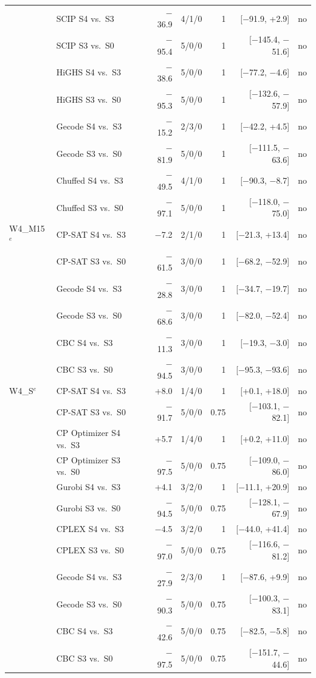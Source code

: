 \begin{longtable}{llrrrrl}
 & SCIP S4 vs.\ S3 & $-$36.9 & 4/1/0 & 1 & [$-$91.9, +2.9] & no \\
 & SCIP S3 vs.\ S0 & $-$95.4 & 5/0/0 & 1 & [$-$145.4, $-$51.6] & no \\
 & HiGHS S4 vs.\ S3 & $-$38.6 & 5/0/0 & 1 & [$-$77.2, $-$4.6] & no \\
 & HiGHS S3 vs.\ S0 & $-$95.3 & 5/0/0 & 1 & [$-$132.6, $-$57.9] & no \\
 & Gecode S4 vs.\ S3 & $-$15.2 & 2/3/0 & 1 & [$-$42.2, +4.5] & no \\
 & Gecode S3 vs.\ S0 & $-$81.9 & 5/0/0 & 1 & [$-$111.5, $-$63.6] & no \\
 & Chuffed S4 vs.\ S3 & $-$49.5 & 4/1/0 & 1 & [$-$90.3, $-$8.7] & no \\
 & Chuffed S3 vs.\ S0 & $-$97.1 & 5/0/0 & 1 & [$-$118.0, $-$75.0] & no \\
W4\_M15$^{e}$ & CP-SAT S4 vs.\ S3 & $-$7.2 & 2/1/0 & 1 & [$-$21.3, +13.4] & no \\
 & CP-SAT S3 vs.\ S0 & $-$61.5 & 3/0/0 & 1 & [$-$68.2, $-$52.9] & no \\
 & Gecode S4 vs.\ S3 & $-$28.8 & 3/0/0 & 1 & [$-$34.7, $-$19.7] & no \\
 & Gecode S3 vs.\ S0 & $-$68.6 & 3/0/0 & 1 & [$-$82.0, $-$52.4] & no \\
 & CBC S4 vs.\ S3 & $-$11.3 & 3/0/0 & 1 & [$-$19.3, $-$3.0] & no \\
 & CBC S3 vs.\ S0 & $-$94.5 & 3/0/0 & 1 & [$-$95.3, $-$93.6] & no \\
W4\_S$^{e}$ & CP-SAT S4 vs.\ S3 & +8.0 & 1/4/0 & 1 & [+0.1, +18.0] & no \\
 & CP-SAT S3 vs.\ S0 & $-$91.7 & 5/0/0 & 0.75 & [$-$103.1, $-$82.1] & no \\
 & CP Optimizer S4 vs.\ S3 & +5.7 & 1/4/0 & 1 & [+0.2, +11.0] & no \\
 & CP Optimizer S3 vs.\ S0 & $-$97.5 & 5/0/0 & 0.75 & [$-$109.0, $-$86.0] & no \\
 & Gurobi S4 vs.\ S3 & +4.1 & 3/2/0 & 1 & [$-$11.1, +20.9] & no \\
 & Gurobi S3 vs.\ S0 & $-$94.5 & 5/0/0 & 0.75 & [$-$128.1, $-$67.9] & no \\
 & CPLEX S4 vs.\ S3 & $-$4.5 & 3/2/0 & 1 & [$-$44.0, +41.4] & no \\
 & CPLEX S3 vs.\ S0 & $-$97.0 & 5/0/0 & 0.75 & [$-$116.6, $-$81.2] & no \\
 & Gecode S4 vs.\ S3 & $-$27.9 & 2/3/0 & 1 & [$-$87.6, +9.9] & no \\
 & Gecode S3 vs.\ S0 & $-$90.3 & 5/0/0 & 0.75 & [$-$100.3, $-$83.1] & no \\
 & CBC S4 vs.\ S3 & $-$42.6 & 5/0/0 & 0.75 & [$-$82.5, $-$5.8] & no \\
 & CBC S3 vs.\ S0 & $-$97.5 & 5/0/0 & 0.75 & [$-$151.7, $-$44.6] & no \\
\bottomrule
\end{longtable}
